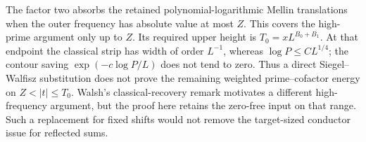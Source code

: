 The factor two absorbs the retained polynomial-logarithmic Mellin
translations when the outer frequency has absolute value at most \(Z\).
This covers the high-prime argument only up to \(Z\). Its required
upper height is \(T_0=xL^{B_0+B_1}\). At that endpoint the
classical strip has width of order \(L^{-1}\), whereas
\(\log P\le CL^{1/4}\); the contour saving
\(\exp(-c\log P/L)\) does not tend to zero. Thus a direct
Siegel--Walfisz substitution does not prove the remaining weighted
prime--cofactor energy on \(Z<|t|\le T_0\).
Walsh's classical-recovery remark \cite[p.~2]{walsh} motivates a
different high-frequency argument, but the proof here retains the
zero-free input on that range. Such a replacement for fixed shifts
would not remove the target-sized conductor issue for reflected sums.
